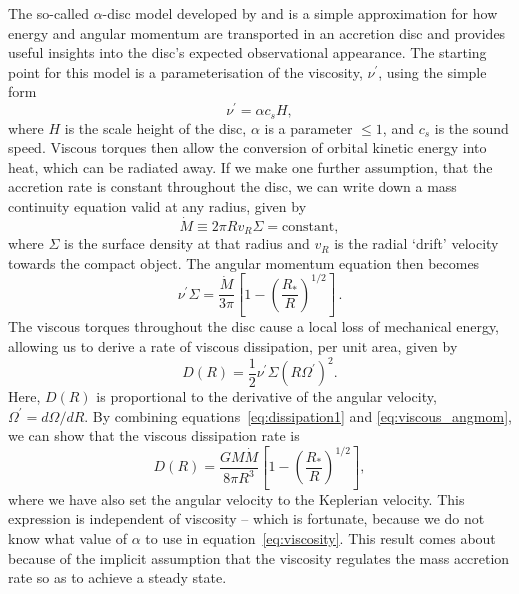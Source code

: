 \label{sec:alpha_disc}
The so-called $\alpha$-disc model developed by 
\citet[][hereafter SS73]{shakurasunyaev1973} and \cite{lyndenbell1969} is
a simple approximation for how energy and angular momentum
are transported in an accretion disc and provides useful insights into
the disc's expected observational appearance. 
The starting point for this model is a parameterisation
of the viscosity, $\nu^\prime$, using the simple form
\begin{equation}
\nu^\prime = \alpha c_s H,
\label{eq:viscosity}
\end{equation}
where $H$ is the scale height of the disc,
$\alpha$ is a parameter $\leq 1$, and $c_s$ is the sound speed.
Viscous torques then allow the conversion of orbital kinetic energy into heat, 
which can be radiated away. 
If we make one further assumption, that the accretion rate is
constant throughout the disc, we can write down a mass continuity equation
valid at any radius, given by
\begin{equation}
\dot{M} \equiv 2 \pi R v_R \Sigma = \mathrm{constant},
\end{equation}
where $\Sigma$ is the surface density at that radius and $v_R$ is the radial `drift' velocity
towards the compact object. The angular momentum equation then becomes
\begin{equation}
\nu^\prime \Sigma = \frac{\dot{M}}{3 \pi} \left[1 - \left( \frac{R_*}{R} \right)^{1/2} \right]\, .
\label{eq:viscous_angmom}
\end{equation}
The viscous torques throughout the disc cause a local loss of mechanical energy, allowing 
us to derive \citep[see, e.g.][]{fkrbook} a rate of viscous dissipation, 
per unit area, given by
\begin{equation}
D(R) = \frac{1}{2} \nu^\prime \Sigma (R \Omega^\prime)^2.
\label{eq:dissipation1}
\end{equation}
Here, $D(R)$ is proportional to the derivative of the angular velocity, $\Omega^\prime=d\Omega/dR$.
By combining equations~\ref{eq:dissipation1} and \ref{eq:viscous_angmom}, we can show that the 
viscous dissipation rate is 
\begin{equation}
D(R) = \frac{G M \dot{M}}{8 \pi R^3} \left[1 - \left( \frac{R_*}{R} \right)^{1/2} \right],
\label{eq:dissipation2}
\end{equation}
where we have also set the angular velocity to the Keplerian velocity. 
This expression is independent of viscosity -- which is fortunate, because
we do not know what value of $\alpha$ to use in equation~\ref{eq:viscosity}.
This result comes about because of the implicit assumption that the viscosity regulates
the mass accretion rate so as to achieve a steady state.

